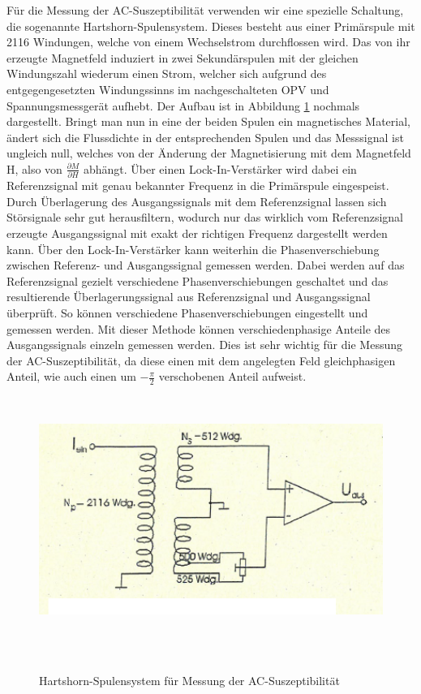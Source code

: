 Für die Messung der AC-Suszeptibilität verwenden wir eine spezielle Schaltung, die sogenannte Hartshorn-Spulensystem. Dieses besteht aus einer Primärspule mit 2116 Windungen, welche von einem Wechselstrom durchflossen wird. Das von ihr erzeugte Magnetfeld induziert in zwei Sekundärspulen mit der gleichen Windungszahl wiederum einen Strom, welcher sich aufgrund des entgegengesetzten Windungssinns im nachgeschalteten OPV und Spannungsmessgerät aufhebt. Der Aufbau ist in Abbildung \ref{aufbau-AC} nochmals dargestellt. Bringt man nun in eine der beiden Spulen ein magnetisches Material, ändert sich die Flussdichte in der entsprechenden Spulen und das Messsignal ist ungleich null, welches von der Änderung der Magnetisierung mit dem Magnetfeld H, also von $\frac{\partial M}{\partial H}$ abhängt. Über einen Lock-In-Verstärker wird dabei ein Referenzsignal mit genau bekannter Frequenz in die Primärspule eingespeist. Durch Überlagerung des Ausgangssignals mit dem Referenzsignal lassen sich Störsignale sehr gut herausfiltern, wodurch nur das wirklich vom Referenzsignal erzeugte Ausgangssignal mit exakt der richtigen Frequenz dargestellt werden kann. Über den Lock-In-Verstärker kann weiterhin die Phasenverschiebung zwischen Referenz- und Ausgangssignal gemessen werden. Dabei werden auf das Referenzsignal gezielt verschiedene Phasenverschiebungen geschaltet und das resultierende Überlagerungssignal aus Referenzsignal und Ausgangssignal überprüft. So können verschiedene Phasenverschiebungen eingestellt und gemessen werden. Mit dieser Methode können verschiedenphasige Anteile des Ausgangssignals einzeln gemessen werden. Dies ist sehr wichtig für die Messung der AC-Suszeptibilität, da diese einen mit dem angelegten Feld gleichphasigen Anteil, wie auch einen um $-\frac{\pi}{2}$ verschobenen Anteil aufweist. 


\begin{figure}[h!]
	\centering
	\includegraphics[height=8cm]{AC-auf.png}	
	~ %
	\caption{Hartshorn-Spulensystem für Messung der AC-Suszeptibilität \cite{Anleitung}}
	\label{aufbau-AC}
\end{figure}

